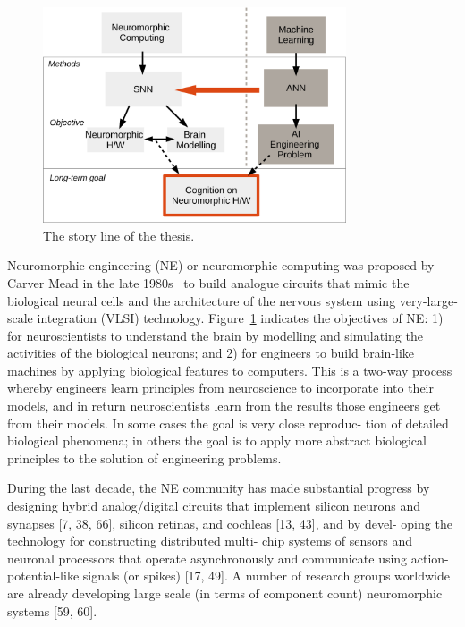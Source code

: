 \begin{figure}[tbh!]
	\centering
	\includegraphics[width=0.8\textwidth]{pics_intro/intro1.pdf}
	\caption{The story line of the thesis.}
	\label{fig:intro}
\end{figure}
Neuromorphic engineering (NE) or neuromorphic computing was proposed by Carver Mead in the late 1980s~\cite{Mead:1989:AVN:64998} to build analogue circuits that mimic the biological neural cells and the architecture of the nervous system using very-large-scale integration (VLSI) technology.
Figure~\ref{fig:intro} indicates the objectives of NE: 1) for neuroscientists to understand the brain by modelling and simulating the activities of the biological neurons; and 2) for engineers to build brain-like machines by applying biological features to computers.
This is a two-way process whereby engineers learn principles from
neuroscience to incorporate into their models, and in return
neuroscientists learn from the results those engineers get from
their models. In some cases the goal is very close reproduc-
tion of detailed biological phenomena; in others the goal is to
apply more abstract biological principles to the solution of
engineering problems.


During the last decade, the NE community has made
substantial progress by designing hybrid analog/digital
circuits that implement silicon neurons and synapses [7, 38,
66], silicon retinas, and cochleas [13, 43], and by devel-
oping the technology for constructing distributed multi-
chip systems of sensors and neuronal processors that
operate asynchronously and communicate using action-
potential-like signals (or spikes) [17, 49]. A number of
research groups worldwide are already developing large
scale (in terms of component count) neuromorphic systems
[59, 60]. 

